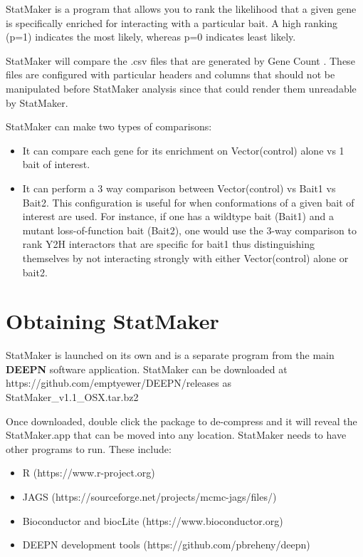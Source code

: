 \documentclass[11pt,fleqn]{book} %
\newcommand{\GeneCount}{{\color{Red} Gene Count }}
\newcommand{\DEEPN}{\textbf{DEEPN }}
\newcommand{\StatMaker}{{\color{Dandelion} StatMaker }}
\begin{document}
\StatMaker is a program that allows you to rank the likelihood that a given gene is specifically enriched for interacting with a particular bait.  A high ranking (p=1) indicates the most likely, whereas p=0 indicates least likely.  

\StatMaker will compare the .csv files that are generated by \GeneCount.  These files are configured with particular headers and columns that should not be manipulated before StatMaker analysis since that could render them unreadable by StatMaker.

\StatMaker can make two types of comparisons:

\begin{itemize}
    \item It can compare each gene for its enrichment on Vector(control) alone vs 1 bait of interest.
    \item It can perform a 3 way comparison between Vector(control) vs Bait1 vs Bait2.  This configuration is useful for when conformations of a given bait of interest are used.  For instance, if one has a wildtype bait (Bait1) and a mutant loss-of-function bait (Bait2), one would use the 3-way comparison to rank Y2H interactors that are specific for bait1 thus distinguishing themselves by not interacting strongly with either Vector(control) alone or bait2.
\end{itemize}

\section{Obtaining StatMaker}
\StatMaker is launched on its own and is a separate program from the main \DEEPN software application.  
\StatMaker can be downloaded at 
https://github.com/emptyewer/DEEPN/releases
as
StatMaker\_v1.1\_OSX.tar.bz2

Once downloaded, double click the package to de-compress and it will reveal the StatMaker.app that can be moved into any location. 
\StatMaker needs to have other programs to run.  These include:
\begin{itemize}
    \item R  (https://www.r-project.org)
    \item JAGS (https://sourceforge.net/projects/mcmc-jags/files/)
    \item Bioconductor and biocLite (https://www.bioconductor.org)
    \item DEEPN development tools (https://github.com/pbreheny/deepn)
\end{itemize}
\end{document}
